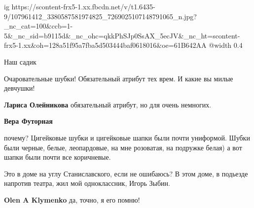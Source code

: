  
 
 
 
 

\ifcmt
  ig https://scontent-frx5-1.xx.fbcdn.net/v/t1.6435-9/107961412_3380587581974825_7269025107148791065_n.jpg?_nc_cat=100&ccb=1-5&_nc_sid=b9115d&_nc_ohc=qkkPhSJp0SsAX_5ecJV&_nc_ht=scontent-frx5-1.xx&oh=128a51f95a7fba5d503444baf0618016&oe=61B642AA
  @width 0.4
\fi

Наш садик

Очаровательные шубки! Обязательный атрибут тех врем. И какие вы милые девчушки!

\textbf{Лариса Олейникова} обязательный атрибут, но для очень немногих.

\textbf{Вера Футорная} 

почему? Цигейковые шубки и цигейковые шапки были почти униформой. Шубки были
черные, белые, леопардовые, на мне розоватая, на подружке белая) а вот шапки
были почти все коричневые.


Это в доме на углу Станиславского, если не ошибаюсь? В этом доме, в подьезде
напротив театра, жил мой одноклассник, Игорь Зыбин.

\textbf{Olen A Klymenko} да, точно, я его помню!
